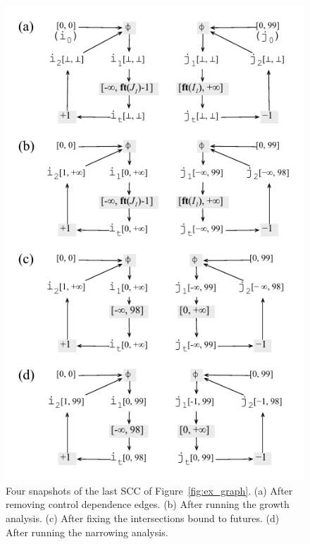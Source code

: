 \documentclass{sigplanconf}[10pt]
\begin{document}
\begin{figure}[t!]
\begin{center}
\includegraphics[width=0.9\columnwidth]{images/ex_partition_grow_crop}
\end{center}
\caption{\label{fig:ex_partition_grow_crop}
Four snapshots of the last SCC of Figure~\ref{fig:ex_graph}.
(a) After removing control dependence edges.
(b) After running the growth analysis.
(c) After fixing the intersections bound to futures.
(d) After running the narrowing analysis.}
\end{figure}
\end{document}
